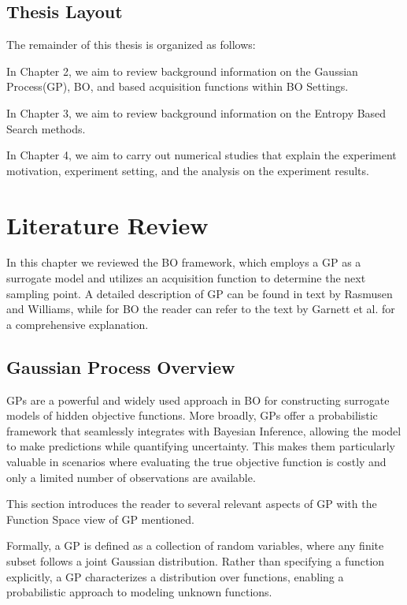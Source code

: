 \documentclass{ut-thesis}
\begin{document}
\section{Thesis Layout}
The remainder of this thesis is organized as follows:

In Chapter 2, we aim to review background information on the Gaussian Process(GP), BO, and based acquisition functions within BO Settings. 

In Chapter 3, we aim to review background information on the Entropy Based Search methods.

In Chapter 4, we aim to carry out numerical studies that explain the experiment motivation, experiment setting, and the analysis on the experiment results.


\chapter{Literature Review}

In this chapter we reviewed the BO framework, which employs a GP as a surrogate model and utilizes an acquisition function to determine the next sampling point. A detailed description of GP can be found in text by Rasmusen and Williams\cite{rasmussen2006gaussian}, while for BO the reader can refer to the text by Garnett et al.\cite{garnett2023bayesian} for a comprehensive explanation.

\section{Gaussian Process Overview}

GPs are a powerful and widely used approach in BO for constructing surrogate models of hidden objective functions\cite{rasmussen2006gaussian}. More broadly, GPs offer a probabilistic framework that seamlessly integrates with Bayesian Inference, allowing the model to make predictions while quantifying uncertainty. This makes them particularly valuable in scenarios where evaluating the true objective function is costly and only a limited number of observations are available.

This section introduces the reader to several relevant aspects of GP with the Function Space view of GP mentioned.

Formally, a GP is defined as a collection of random variables, where any finite subset follows a joint Gaussian distribution. Rather than specifying a function explicitly, a GP characterizes a distribution over functions, enabling a probabilistic approach to modeling unknown functions\cite{rasmussen2006gaussian}.
\end{document}
